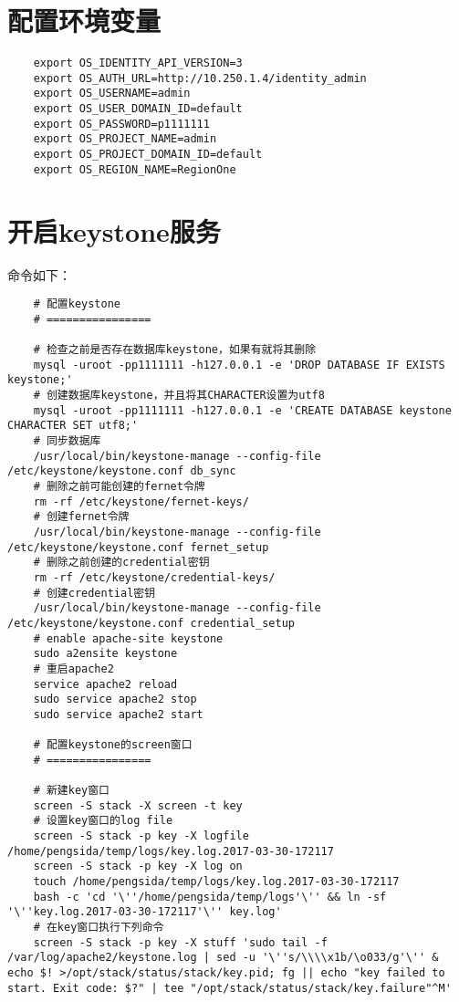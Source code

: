 \documentclass[a4paper,left=1.5cm,right=1.5cm,11pt]{article}
\begin{document}
\section{配置环境变量}
	\begin{lstlisting}
	export OS_IDENTITY_API_VERSION=3
    export OS_AUTH_URL=http://10.250.1.4/identity_admin
    export OS_USERNAME=admin
    export OS_USER_DOMAIN_ID=default
    export OS_PASSWORD=p1111111
    export OS_PROJECT_NAME=admin
    export OS_PROJECT_DOMAIN_ID=default
    export OS_REGION_NAME=RegionOne
	\end{lstlisting}

\section{开启keystone服务}
	命令如下：
	\begin{lstlisting}
	# 配置keystone
	# ================

	# 检查之前是否存在数据库keystone，如果有就将其删除
	mysql -uroot -pp1111111 -h127.0.0.1 -e 'DROP DATABASE IF EXISTS keystone;'
	# 创建数据库keystone，并且将其CHARACTER设置为utf8
	mysql -uroot -pp1111111 -h127.0.0.1 -e 'CREATE DATABASE keystone CHARACTER SET utf8;'
	# 同步数据库
	/usr/local/bin/keystone-manage --config-file /etc/keystone/keystone.conf db_sync
	# 删除之前可能创建的fernet令牌
	rm -rf /etc/keystone/fernet-keys/
	# 创建fernet令牌
	/usr/local/bin/keystone-manage --config-file /etc/keystone/keystone.conf fernet_setup
	# 删除之前创建的credential密钥
	rm -rf /etc/keystone/credential-keys/
	# 创建credential密钥
	/usr/local/bin/keystone-manage --config-file /etc/keystone/keystone.conf credential_setup
	# enable apache-site keystone
	sudo a2ensite keystone
	# 重启apache2
	service apache2 reload
	sudo service apache2 stop
	sudo service apache2 start

	# 配置keystone的screen窗口
	# ================

	# 新建key窗口
	screen -S stack -X screen -t key
	# 设置key窗口的log file
	screen -S stack -p key -X logfile /home/pengsida/temp/logs/key.log.2017-03-30-172117
	screen -S stack -p key -X log on
	touch /home/pengsida/temp/logs/key.log.2017-03-30-172117
	bash -c 'cd '\''/home/pengsida/temp/logs'\'' && ln -sf '\''key.log.2017-03-30-172117'\'' key.log'
	# 在key窗口执行下列命令
	screen -S stack -p key -X stuff 'sudo tail -f /var/log/apache2/keystone.log | sed -u '\''s/\\\\x1b/\o033/g'\'' & echo $! >/opt/stack/status/stack/key.pid; fg || echo "key failed to start. Exit code: $?" | tee "/opt/stack/status/stack/key.failure"^M'


\end{lstlisting}
\end{document}
